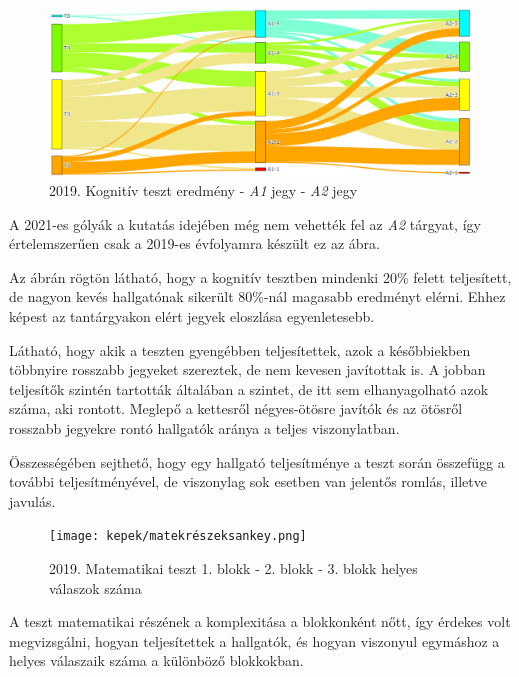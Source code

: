 \documentclass[12pt]{article}
\begin{document}
\begin{figure}[H]
\centering
\includegraphics[scale=0.573]{kepek/teszt-a1-a2.png}
\caption{2019. Kognitív teszt eredmény - \textit{A1} jegy - \textit{A2} jegy}
\label{fig:teszt-a1-a2}
\end{figure}

A 2021-es gólyák a kutatás idejében még nem vehették fel az \textit{A2} tárgyat, így értelemszerűen csak a 2019-es évfolyamra készült ez az ábra.

Az ábrán rögtön látható, hogy a kognitív tesztben mindenki 20\% felett teljesített, de nagyon kevés hallgatónak sikerült 80\%-nál magasabb eredményt elérni. Ehhez képest az tantárgyakon elért jegyek eloszlása egyenletesebb. 

Látható, hogy akik a teszten gyengébben teljesítettek, azok a későbbiekben többnyire rosszabb jegyeket szereztek, de nem kevesen javítottak is. A jobban teljesítők szintén tartották általában a szintet, de itt sem elhanyagolható azok száma, aki rontott. Meglepő a kettesről négyes-ötösre javítók és az ötösről rosszabb jegyekre rontó hallgatók aránya a teljes viszonylatban.

Összességében sejthető, hogy egy hallgató teljesítménye a teszt során összefügg a további teljesítményével, de viszonylag sok esetben van jelentős romlás, illetve javulás.

\begin{figure}[H]
\centering
\texttt{[image: kepek/matekrészeksankey.png]}
\caption{2019. Matematikai teszt 1. blokk - 2. blokk - 3. blokk helyes válaszok száma}
\label{fig:matekrészeksankey}
\end{figure}

A teszt matematikai részének a komplexitása a blokkonként nőtt, így érdekes volt megvizsgálni, hogyan teljesítettek a hallgatók, és hogyan viszonyul egymáshoz a helyes válaszaik száma a különböző blokkokban.
\end{document}
